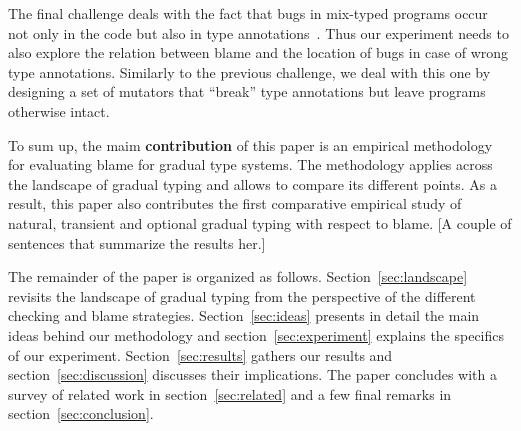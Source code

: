 The final challenge deals with the fact that bugs in mix-typed programs
occur not only in the code but also in type
annotations~\cite{sta-nt-base-types, incorrect-ts, wmwz-ecoop-2017}. Thus
our experiment needs to also explore the relation between blame and the
location of bugs in case of wrong type annotations. Similarly to the previous challenge, we
deal with this one by designing a set of mutators that ``break'' type
annotations but leave programs otherwise intact. 

To sum up, the maim {\bf contribution} of this paper is an empirical  methodology for
evaluating blame for gradual type systems. The methodology applies across the
landscape of gradual typing and allows to compare its different points. 
  As a result, this paper also contributes the first comparative
empirical study of natural, transient and optional gradual typing
with respect to blame. [A couple of sentences that summarize the results
her.]

The remainder of the paper is organized as follows.
Section~\ref{sec:landscape} revisits the landscape of gradual typing from
the perspective of the different checking and blame strategies.
Section~\ref{sec:ideas} presents in detail the main ideas behind our
methodology and section~\ref{sec:experiment} explains the specifics of our
experiment. Section~\ref{sec:results} gathers our results and
section~\ref{sec:discussion} discusses their implications. The paper
concludes with a survey of related work in section~\ref{sec:related} and 
a few final remarks in section~\ref{sec:conclusion}.
